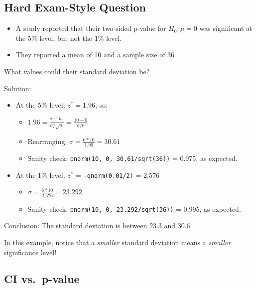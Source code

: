 \documentclass[
  letterpaper,
  DIV=11,
  numbers=noendperiod]{scrreprt}
\providecommand{\tightlist}{%
  \setlength{\itemsep}{0pt}\setlength{\parskip}{0pt}}\usepackage{longtable,booktabs,array}
\begin{document}
\hypertarget{hard-exam-style-question}{%
\subsection{Hard Exam-Style Question}\label{hard-exam-style-question}}

\begin{itemize}
\tightlist
\item
  A study reported that their two-sided p-value for \(H_0:\mu = 0\) was
  significant at the 5\% level, but not the 1\% level.
\item
  They reported a mean of 10 and a sample size of 36
\end{itemize}

What values could their standard deviation be?

Solution:

\begin{itemize}
\tightlist
\item
  At the 5\% level, \(z^* = 1.96\), so:

  \begin{itemize}
  \tightlist
  \item
    \(1.96 = \frac{x - \mu_0}{\sigma/\sqrt{n}} = \frac{10 - 0}{\sigma/6}\)
  \item
    Rearranging, \(\sigma= \frac{6*10}{1.96} = 30.61\)
  \item
    Sanity check: \texttt{pnorm(10,\ 0,\ 30.61/sqrt(36))} = 0.975, as
    expected.
  \end{itemize}
\item
  At the 1\% level, \(z^*\) = \texttt{-qnorm(0.01/2)} = 2.576

  \begin{itemize}
  \tightlist
  \item
    \(\sigma= \frac{6*10}{2.576} = 23.292\)
  \item
    Sanity check: \texttt{pnorm(10,\ 0,\ 23.292/sqrt(36))} = 0.995, as
    expected.
  \end{itemize}
\end{itemize}

Conclusion: The standard deviation is between 23.3 and 30.6.

In this example, notice that a \emph{smaller} standard deviation means a
\emph{smaller} significance level!

\hypertarget{ci-vs.-p-value}{%
\subsection{CI vs.~p-value}\label{ci-vs.-p-value}}
\end{document}
